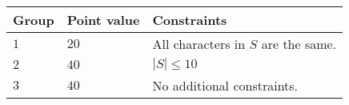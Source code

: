 \noindent
\begin{tabular}{| l | l | p{12cm} |}
  \hline
  \textbf{Group} & \textbf{Point value} & \textbf{Constraints} \\ \hline
  $1$    & $20$      & All characters in $S$ are the same. \\ \hline
  $2$    & $40$      & $|S| \leq 10$ \\ \hline
  $3$    & $40$      & No additional constraints. \\ \hline
\end{tabular}